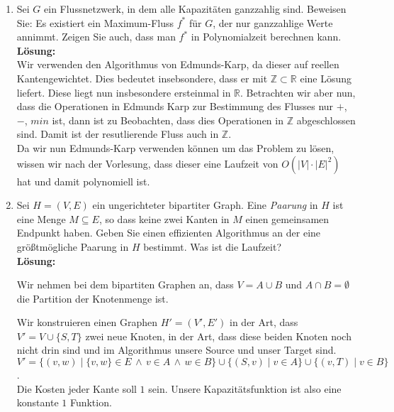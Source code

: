 \documentclass[11pt,a4paper,ngerman]{article}
\begin{document}
\begin{enumerate}[\bfseries a)]


\item Sei $G$ ein Flussnetzwerk, in dem alle Kapazitäten ganzzahlig sind. Beweisen Sie: Es existiert ein Maximum-Fluss $f^*$ für $G$, der nur ganzzahlige Werte annimmt. Zeigen Sie auch, dass man $f^*$ in Polynomialzeit berechnen kann.\\

\textbf{Lösung:}\\

Wir verwenden den Algorithmus von Edmunds-Karp, da dieser auf reellen Kantengewichtet. Dies bedeutet insebsondere, dass er mit $\mathbb{Z} \subset \mathbb{R}$ eine Lösung liefert. Diese liegt nun insbesondere ersteinmal in $\mathbb{R}$. Betrachten wir aber nun, dass die Operationen in Edmunds Karp zur Bestimmung des Flusses nur $+$, $-$, $min$ ist, dann ist zu Beobachten, dass dies Operationen in $\mathbb{Z}$ abgeschlossen sind. Damit ist der resutlierende Fluss auch in $\mathbb{Z}$.\\

Da wir nun Edmunds-Karp verwenden können um das Problem zu lösen, wissen wir nach der Vorlesung, dass dieser eine Laufzeit von $O(|V|\cdot |E|^2)$ hat und damit polynomiell ist.

\item Sei $H= \left( V , E \right)$ ein ungerichteter bipartiter Graph. Eine \emph{Paarung} in $H$ ist eine Menge $M \subseteq E$, so dass keine zwei Kanten in $M$ einen gemeinsamen Endpunkt haben. Geben Sie einen effizienten Algorithmus an der eine größtmögliche Paarung in $H$ bestimmt. Was ist die Laufzeit?\\

\textbf{Lösung:}

Wir nehmen bei dem bipartiten Graphen an, dass $V = A \cup B$ und $A \cap B = \emptyset$ die Partition der Knotenmenge ist.

Wir konstruieren einen Graphen $H' = (V', E')$ in der Art, dass $V' = V \cup \{ S, T \}$ zwei neue Knoten, in der Art, dass diese beiden Knoten noch nicht drin sind und im Algorithmus unsere Source und unser Target sind. \\
$V' = \{ (v,w) \; | \; \{v,w\} \in E \, \land \, v \in A \, \land \, w \in B\} \cup \{ (S,v) \;| \; v \in A\} \cup \{ (v,T) \; | \; v \in B \}$.\\
Die Kosten jeder Kante soll $1$ sein. Unsere Kapazitätsfunktion ist also eine konstante $1$ Funktion.\\



\end{enumerate}
\end{document}
